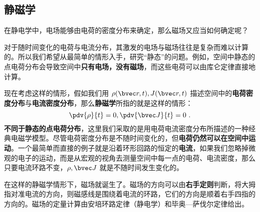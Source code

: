 \subsection{静磁学}
在静电学中，电场能够由电荷的密度分布来确定，那么磁场又应当如何确定呢？

对于随时间变化的电荷与电流分布，其激发的电场与磁场往往是复杂而难以计算的。所以我们希望从最简单的情形入手，研究“静态”的问题。例如，空间中静态的点电荷分布会导致空间中\textbf{只有电场，没有磁场}，而这些电荷可以由库仑定律直接地计算。

现在考虑这样的情形，假如我们用 $\rho(\bvec r,t),J(\bvec r,t)$ 描述空间中的\textbf{电荷密度分布}与\textbf{电流密度分布}，那么\textbf{静磁学}所指的就是这样的情形：
\begin{equation}
\pdv{\rho}{t}=0,\pdv{\bvec J}{t}=0~.
\end{equation}
\textbf{不同于静态的点电荷分布}，这里我们采取的是用电荷电流密度分布所描述的一种经典电磁学模型。尽管电荷密度分布是不随时间变化的，但\textbf{电荷仍然可以在空间中运动}。一个最简单而直接的例子就是沿着环形回路的恒定的\textbf{电流}，如果我们忽略掉微观的电子的运动，而是从宏观的视角去测量空间中每一点的电荷、电流密度，那么只要电流环路不变，$\rho,\bvec J$ 就是不随时间发生变化的。

在这样的静磁学情形下，磁场就诞生了。磁场的方向可以由\textbf{右手定则}判断，将大拇指对准电流的方向，则磁感线是围绕着电流的环路，它们的方向是顺着右手四指的方向的。磁场的定量计算由安培环路定律（静电学）和毕奥—萨伐尔定律给出。
